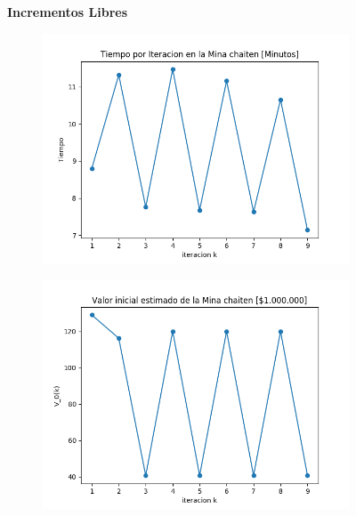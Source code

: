 \documentclass[12pt,letterpaper]{article}
\begin{document}
\begin{figure}[H]
  \captionsetup[subfigure]{labelformat=empty}
  \centering
  \textbf{Incrementos Libres}
  
  \begin{subfigure}[b]{0.4\textwidth}
     \includegraphics[width=\textwidth]{Graficos/FiltradosCauchyLibre/chaiten_inc_times..png}
     \caption{}
     \label{fig:ex1}
  \end{subfigure}
  \begin{subfigure}[b]{0.4\textwidth}
     \includegraphics[width=\textwidth]{Graficos/FiltradosCauchyLibre/chaiten_inc_v_k..png}
     \caption{}
     \label{fig:ex2}
  \end{subfigure}
\end{figure}
\end{document}
